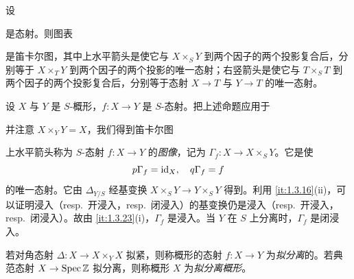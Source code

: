 \begin{proposition}\label{it:1.3.24}
设
\begin{center}
\end{center}
是态射。则图表
\begin{center}
\end{center}
是笛卡尔图，其中上水平箭头是使它与 $X\times_S Y$ 到两个因子的两个投影复合后，分别等于 $X\times_T Y$ 到两个因子的两个投影的唯一态射；右竖箭头是使它与 $T\times_S T$ 到两个因子的两个投影复合后，分别等于态射 $X\to T$ 与 $Y\to T$ 的唯一态射。
\end{proposition}
设 $X$ 与 $Y$ 是 $S$-概形，$f\colon X\to Y$ 是 $S$-态射。把上述命题应用于
\begin{center}
\end{center}
并注意 $X\times_Y Y=X$，我们得到笛卡尔图
\begin{center}
\end{center}
上水平箭头称为 $S$-态射 $f\colon X\to Y$ 的\emph{图像}，记为 $\Gamma_f\colon X\to X\times_S Y$。它是使
\[
p\Gamma_f=\operatorname{id}_X,\quad q\Gamma_f=f
\]
的唯一态射。它由 $\Delta_{Y/S}$ 经基变换 $X\times_S Y\to Y\times_S Y$ 得到。利用 \ref{it:1.3.16}(ii)，可以证明浸入（resp.\ 开浸入，resp.\ 闭浸入）的基变换仍是浸入（resp.\ 开浸入，resp.\ 闭浸入）。故由 \ref{it:1.3.23}(i)，$\Gamma_f$ 是浸入。当 $Y$ 在 $S$ 上分离时，$\Gamma_f$ 是闭浸入。

若对角态射 $\Delta\colon X\to X\times_Y X$ 拟紧，则称概形的态射 $f\colon X\to Y$ 为\emph{拟分离}的。若典范态射 $X\to \operatorname{Spec}\mathbb{Z}$ 拟分离，则称概形 $X$ 为\emph{拟分离概形}。

